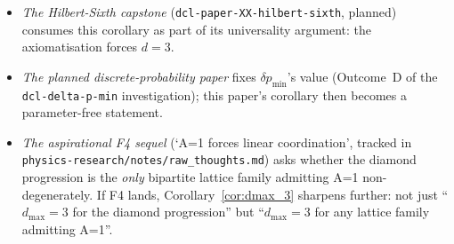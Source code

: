 \begin{itemize}
\item \emph{The Hilbert-Sixth capstone}
      (\texttt{dcl-paper-XX-hilbert-sixth}, planned) consumes this
      corollary as part of its universality argument: the
      axiomatisation forces $d = 3$.
\item \emph{The planned discrete-probability paper} fixes
      $\delta p_\min$'s value (Outcome~D of the
      \texttt{dcl-delta-p-min} investigation); this paper's
      corollary then becomes a parameter-free statement.
\item \emph{The aspirational F4 sequel} (`A=1 forces linear
      coordination', tracked in
      \texttt{physics-research/notes/raw\_thoughts.md}) asks
      whether the diamond progression is the \emph{only} bipartite
      lattice family admitting A=1 non-degenerately.  If F4 lands,
      Corollary~\ref{cor:dmax_3} sharpens further: not just
      ``$d_\max = 3$ for the diamond progression'' but ``$d_\max
      = 3$ for any lattice family admitting A=1''.
\end{itemize}
